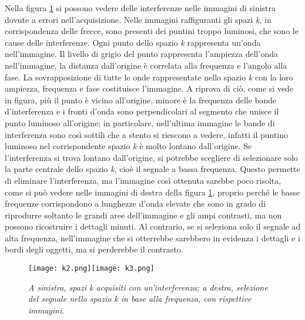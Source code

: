 \documentclass{report}
\newcommand{\figref}[1]{figura \ref{#1}}
\numberwithin{equation}{section}
\numberwithin{figure}{section}
\begin{document}
Nella \figref{fig:k2} si possono vedere delle interferenze nelle immagini di sinistra dovute a errori nell'acquisizione. Nelle immagini raffiguranti gli spazi \textit{k}, in corrispondenza delle frecce, sono presenti dei puntini troppo luminosi, che sono le cause delle interferenze. Ogni punto dello spazio \textit{k} rappresenta un’onda nell'immagine. Il livello di grigio del punto rappresenta l’ampiezza dell'onda nell'immagine, la distanza dall'origine è correlata alla frequenza e l’angolo alla fase. La sovrapposizione di tutte le onde rappresentate nello spazio \textit{k} con la loro ampiezza, frequenza e fase costituisce l’immagine. A riprova di ciò, come si vede in figura, più il punto è vicino all'origine, minore è la frequenza delle bande d'interferenza e i fronti d'onda sono perpendicolari al segmento che unisce il punto luminoso all'origine; in particolare, nell'ultima immagine le bande di interferenza sono così sottili che a stento si riescono a vedere, infatti il puntino luminoso nel corrispondente spazio \textit{k} è molto lontano dall'origine. Se l'interferenza si trova lontano dall'origine, si potrebbe scegliere di selezionare solo la parte centrale dello spazio \textit{k}, cioè il segnale a bassa frequenza. Questo permette di eliminare l'interferenza, ma l'immagine così ottenuta sarebbe poco risolta, come si può vedere nelle immagini di destra della \figref{fig:k2}, proprio perché le basse frequenze corrispondono a lunghezze d'onda elevate che sono in grado di riprodurre soltanto le grandi aree dell'immagine e gli ampi contrasti, ma non possono ricostruire i dettagli minuti. Al contrario, se si seleziona solo il segnale ad alta frequenza, nell'immagine che si otterrebbe sarebbero in evidenza i dettagli e i bordi degli oggetti, ma si perderebbe il contrasto.

\begin{figure}[htp]
\centering
\texttt{[image: k2.png]}\quad\texttt{[image: k3.png]}
\caption{\label{fig:k2} \textit{A sinistra, spazi k acquisiti con un'interferenza; a destra, selezione del segnale nello spazio k in base alla frequenza, con rispettive immagini}.}
\end{figure}

\vspace{-5 pt}
\end{document}
